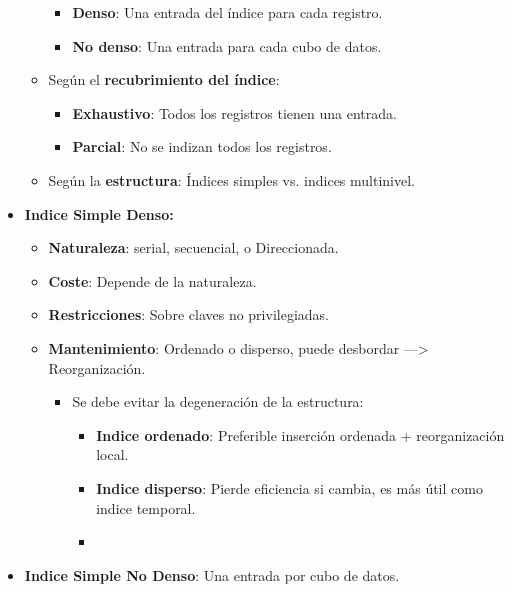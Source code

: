 \documentclass[12pt, twoside, openright]{report} %
\begin{document}
\begin{itemize}
\begin{itemize}
      \begin{itemize}
      \item \textbf{Denso}: Una entrada del índice para cada registro.
        
      \item \textbf{No denso}: Una entrada para cada cubo de datos.
        
      \end{itemize}
    \item Según el \textbf{recubrimiento del índice}:
      

      \begin{itemize}
      \item \textbf{Exhaustivo}: Todos los registros tienen una entrada.
        
      \item \textbf{Parcial}: No se indizan todos los registros.
        
      \end{itemize}
    \item Según la \textbf{estructura}: Índices simples vs. indices
      multinivel.
      
    \end{itemize}
	\pagebreak
  \item \textbf{Indice Simple Denso:}
    

    \begin{itemize}
    \item \textbf{Naturaleza}: serial, secuencial, o Direccionada.
      
    \item \textbf{Coste}: Depende de la naturaleza.
      
    \item \textbf{Restricciones}: Sobre claves no privilegiadas.
      
    \item \textbf{Mantenimiento}: Ordenado o disperso, puede desbordar
      ---\textgreater{} Reorganización.
      

      \begin{itemize}
      \item Se debe evitar la degeneración de la estructura:
        

        \begin{itemize}
        \item \textbf{Indice ordenado}: Preferible inserción ordenada +
          reorganización local.
          
        \item \textbf{Indice disperso}: Pierde eficiencia si cambia, es más
          útil como indice temporal.
          \item \end{itemize}
      \end{itemize}
    \end{itemize}
  \item \textbf{Indice Simple No Denso}: Una entrada por cubo de datos.
    


\end{itemize}
\end{document}
